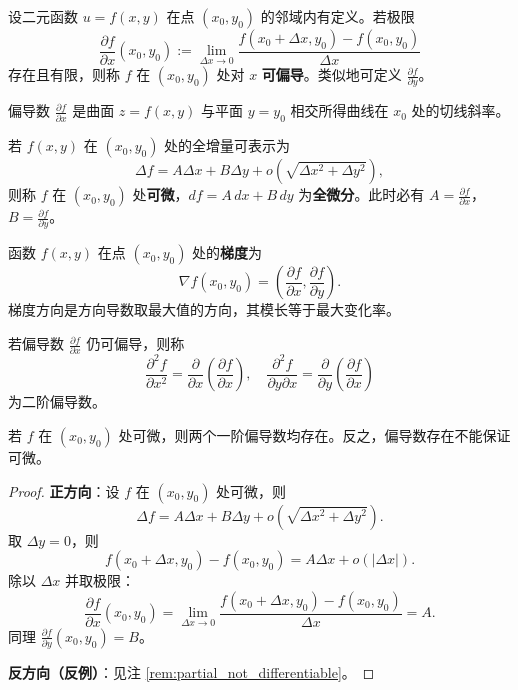 \begin{definition}[偏导数作为单方向算子]\label{def:partial_derivative}
设二元函数 $u = f(x, y)$ 在点 $(x_0, y_0)$ 的邻域内有定义。若极限
\[\frac{\partial f}{\partial x}(x_0, y_0) := \lim_{\Delta x \to 0} \frac{f(x_0 + \Delta x, y_0) - f(x_0, y_0)}{\Delta x}\]
存在且有限，则称 $f$ 在 $(x_0, y_0)$ 处对 $x$ \textbf{可偏导}。类似地可定义 $\frac{\partial f}{\partial y}$。

偏导数 $\frac{\partial f}{\partial x}$ 是曲面 $z = f(x,y)$ 与平面 $y = y_0$ 相交所得曲线在 $x_0$ 处的切线斜率。
\end{definition}

\begin{definition}[全微分与方向增量]\label{def:total_differential}
若 $f(x, y)$ 在 $(x_0, y_0)$ 处的全增量可表示为
\[\Delta f = A\Delta x + B\Delta y + o\!\left(\sqrt{\Delta x^2 + \Delta y^2}\right),\]
则称 $f$ 在 $(x_0, y_0)$ 处\textbf{可微}，$df = A\,dx + B\,dy$ 为\textbf{全微分}。此时必有 $A = \frac{\partial f}{\partial x}$，$B = \frac{\partial f}{\partial y}$。
\end{definition}

\begin{definition}[梯度作为方向导数最大值方向]\label{def:gradient_direction}
函数 $f(x, y)$ 在点 $(x_0, y_0)$ 处的\textbf{梯度}为
\[\nabla f(x_0, y_0) = \left( \frac{\partial f}{\partial x}, \frac{\partial f}{\partial y} \right).\]
梯度方向是方向导数取最大值的方向，其模长等于最大变化率。
\end{definition}

\begin{definition}[高阶偏导数与混合偏导数]\label{def:higher_partial}
若偏导数 $\frac{\partial f}{\partial x}$ 仍可偏导，则称
\[\frac{\partial^2 f}{\partial x^2} = \frac{\partial}{\partial x}\left(\frac{\partial f}{\partial x}\right),\quad
\frac{\partial^2 f}{\partial y \partial x} = \frac{\partial}{\partial y}\left(\frac{\partial f}{\partial x}\right)\]
为二阶偏导数。
\end{definition}

\begin{proposition}[可微与偏导的关系]\label{prop:diff_partial}
若 $f$ 在 $(x_0, y_0)$ 处可微，则两个一阶偏导数均存在。反之，偏导数存在不能保证可微。
\end{proposition}

\begin{proof}
\textbf{正方向}：设 $f$ 在 $(x_0, y_0)$ 处可微，则
\[
\Delta f = A\Delta x + B\Delta y + o\!\left(\sqrt{\Delta x^2 + \Delta y^2}\right).
\]
取 $\Delta y = 0$，则
\[
f(x_0 + \Delta x, y_0) - f(x_0, y_0) = A\Delta x + o(|\Delta x|).
\]
除以 $\Delta x$ 并取极限：
\[
\frac{\partial f}{\partial x}(x_0, y_0) = \lim_{\Delta x \to 0} \frac{f(x_0+\Delta x, y_0) - f(x_0, y_0)}{\Delta x} = A.
\]
同理 $\frac{\partial f}{\partial y}(x_0, y_0) = B$。

\textbf{反方向（反例）}：见注 \ref{rem:partial_not_differentiable}。
\end{proof}

